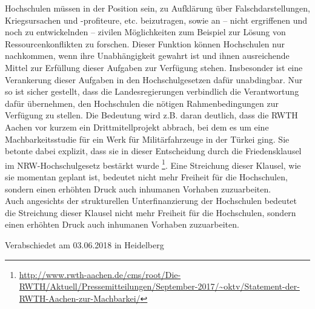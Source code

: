 \documentclass[DIV=calc]{scrartcl}
\begin{document}
Hochschulen müssen in der Position sein, zu Aufklärung über Falschdarstellungen, Kriegsursachen und -profiteure, etc. beizutragen, sowie an – nicht ergriffenen und noch zu entwickelnden – zivilen Möglichkeiten zum Beispiel zur Lösung von Ressourcenkonflikten zu forschen. Dieser Funktion können Hochschulen nur nachkommen, wenn ihre Unabhängigkeit gewahrt ist und ihnen ausreichende Mittel zur Erfüllung dieser Aufgaben zur Verfügung stehen.
Insbesonder ist eine Verankerung dieser Aufgaben in den Hochschulgesetzen dafür unabdingbar. Nur so ist sicher gestellt, dass die Landesregierungen verbindlich die Verantwortung dafür übernehmen, den Hochschulen die nötigen Rahmenbedingungen zur Verfügung zu stellen.
Die Bedeutung wird z.B. daran deutlich, dass die RWTH Aachen vor kurzem ein Drittmitellprojekt abbrach, bei dem es um eine Machbarkeitsstudie für ein Werk für Militärfahrzeuge in der Türkei ging. Sie betonte dabei explizit, dass sie in dieser Entscheidung durch die Friedensklausel im NRW-Hochschulgesetz bestärkt wurde \footnote{\url{http://www.rwth-aachen.de/cms/root/Die-RWTH/Aktuell/Pressemitteilungen/September-2017/~oktv/Statement-der-RWTH-Aachen-zur-Machbarkei/}}. Eine Streichung dieser Klausel, wie sie momentan geplant ist, bedeutet nicht mehr Freiheit für die Hochschulen, sondern einen erhöhten Druck auch inhumanen Vorhaben zuzuarbeiten.\\
Auch angesichts der strukturellen Unterfinanzierung der Hochschulen bedeutet die Streichung dieser Klausel nicht mehr Freiheit für die Hochschulen, sondern einen erhöhten Druck auch inhumanen Vorhaben zuzuarbeiten.
\vfill
    \begin{flushright}
        Verabschiedet am 03.06.2018 in Heidelberg
    \end{flushright}
\end{document}

